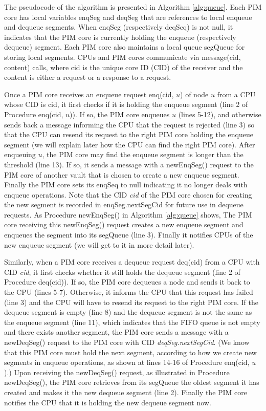 The pseudocode of the algorithm is presented in Algorithm \ref{alg:queue}. 
Each PIM core has local variables enqSeg and deqSeg that are references to 
local enqueue and dequeue segments.
When enqSeg (respectively deqSeq) is not null, it indicates that the PIM core is currently 
holding the enqueue (respectively dequeue) segment.
Each PIM core also maintains a local queue segQueue for storing local segments.
CPUs and PIM cores communicate via message(cid, content) calls, where cid is the unique core ID (CID) 
of the receiver and the content is either a request or a response to a request.

Once a PIM core receives an enqueue request enq(cid, $u$) of node $u$ from a CPU whose CID is cid,
it first checks if it is holding the enqueue segment (line 2 of Procedure enq(cid, $u$)).
If so, the PIM core enqueues $u$ (lines 5-12), and otherwise sends back a message
informing the CPU that the request is rejected (line 3) so that
the CPU can resend its request to the right PIM core holding the enqueue segment
(we will explain later how the CPU can find the right PIM core).
After enqueuing $u$, the PIM core may find the enqueue segment is longer than the threshold (line 13).
If so, it sends a message with a newEnqSeg() request to the PIM core of another vault that is chosen 
to create a new enqueue segment.
Finally the PIM core sets its enqSeq to null indicating it no longer deals with enqueue operations.
Note that the CID \emph{cid} of the PIM core chosen for creating the new segment is recorded in 
enqSeg.nextSegCid for future use in dequeue requests.
As Procedure newEnqSeg() in Algorithm \ref{alg:queue} shows,
The PIM core receiving this newEnqSeg() request creates a new enqueue segment and enqueues 
the segment into its segQueue (line 3). 
Finally it notifies CPUs of the new enqueue segment (we will get to it in more detail later).

Similarly, when a PIM core receives a dequeue request deq(cid) from a CPU with CID \emph{cid},
it first checks whether it still holds the dequeue segment (line 2 of Procedure deq(cid)).
If so, the PIM core dequeues a node and sends it back to the CPU (lines 5-7).
Otherwise, it informs the CPU that this request has failed (line 3) and
the CPU will have to resend its request to the right PIM core.
If the dequeue segment is empty (line 8) and the dequeue segment is not the same as 
the enqueue segment (line 11), which indicates that the FIFO queue is not empty 
and there exists another segment, the PIM core sends a message with a newDeqSeg() request 
to the PIM core with CID \emph{deqSeg.nextSegCid}. 
(We know that this PIM core must hold the next segment, 
according to how we create new segments in enqueue operations, 
as shown at lines 14-16 of Procedure enq(cid, $u$).) 
Upon receiving the newDeqSeg() request, as illustrated in Procedure newDeqSeg(), 
the PIM core retrieves from its segQueue the oldest segment it has created and 
makes it the new dequeue segment (line 2). 
Finally the PIM core notifies the CPU that it is holding the new dequeue segment now.

